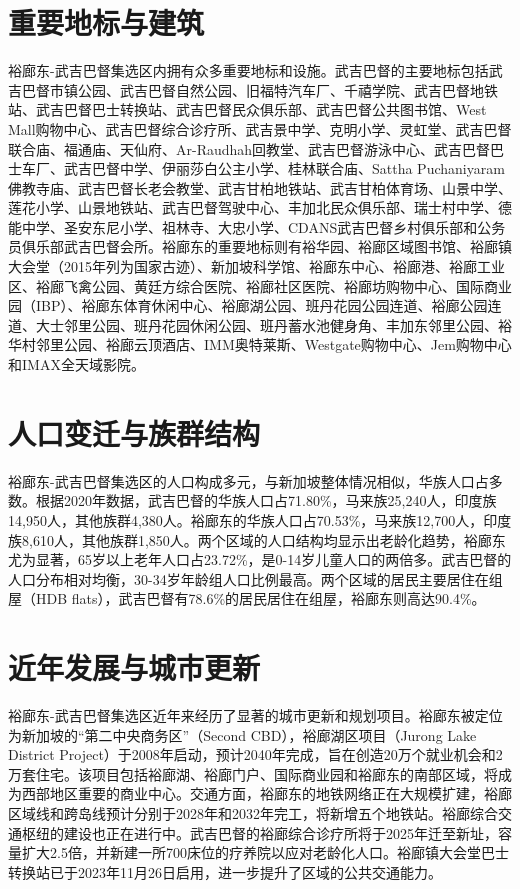 \documentclass[11pt,a4paper,twoside,openany]{book}
\begin{document}
\section{重要地标与建筑}
裕廊东-武吉巴督集选区内拥有众多重要地标和设施。武吉巴督的主要地标包括武吉巴督市镇公园、武吉巴督自然公园、旧福特汽车厂、千禧学院、武吉巴督地铁站、武吉巴督巴士转换站、武吉巴督民众俱乐部、武吉巴督公共图书馆、West Mall购物中心、武吉巴督综合诊疗所、武吉景中学、克明小学、灵虹堂、武吉巴督联合庙、福通庙、天仙府、Ar-Raudhah回教堂、武吉巴督游泳中心、武吉巴督巴士车厂、武吉巴督中学、伊丽莎白公主小学、桂林联合庙、Sattha Puchaniyaram佛教寺庙、武吉巴督长老会教堂、武吉甘柏地铁站、武吉甘柏体育场、山景中学、莲花小学、山景地铁站、武吉巴督驾驶中心、丰加北民众俱乐部、瑞士村中学、德能中学、圣安东尼小学、祖林寺、大忠小学、CDANS武吉巴督乡村俱乐部和公务员俱乐部武吉巴督会所。裕廊东的重要地标则有裕华园、裕廊区域图书馆、裕廊镇大会堂（2015年列为国家古迹）、新加坡科学馆、裕廊东中心、裕廊港、裕廊工业区、裕廊飞禽公园、黄廷方综合医院、裕廊社区医院、裕廊坊购物中心、国际商业园（IBP）、裕廊东体育休闲中心、裕廊湖公园、班丹花园公园连道、裕廊公园连道、大士邻里公园、班丹花园休闲公园、班丹蓄水池健身角、丰加东邻里公园、裕华村邻里公园、裕廊云顶酒店、IMM奥特莱斯、Westgate购物中心、Jem购物中心和IMAX全天域影院。

\section{人口变迁与族群结构}
裕廊东-武吉巴督集选区的人口构成多元，与新加坡整体情况相似，华族人口占多数。根据2020年数据，武吉巴督的华族人口占71.80\%，马来族25,240人，印度族14,950人，其他族群4,380人。裕廊东的华族人口占70.53\%，马来族12,700人，印度族8,610人，其他族群1,850人。两个区域的人口结构均显示出老龄化趋势，裕廊东尤为显著，65岁以上老年人口占23.72\%，是0-14岁儿童人口的两倍多。武吉巴督的人口分布相对均衡，30-34岁年龄组人口比例最高。两个区域的居民主要居住在组屋（HDB flats），武吉巴督有78.6\%的居民居住在组屋，裕廊东则高达90.4\%。

\section{近年发展与城市更新}
裕廊东-武吉巴督集选区近年来经历了显著的城市更新和规划项目。裕廊东被定位为新加坡的“第二中央商务区”（Second CBD），裕廊湖区项目（Jurong Lake District Project）于2008年启动，预计2040年完成，旨在创造20万个就业机会和2万套住宅。该项目包括裕廊湖、裕廊门户、国际商业园和裕廊东的南部区域，将成为西部地区重要的商业中心。交通方面，裕廊东的地铁网络正在大规模扩建，裕廊区域线和跨岛线预计分别于2028年和2032年完工，将新增五个地铁站。裕廊综合交通枢纽的建设也正在进行中。武吉巴督的裕廊综合诊疗所将于2025年迁至新址，容量扩大2.5倍，并新建一所700床位的疗养院以应对老龄化人口。裕廊镇大会堂巴士转换站已于2023年11月26日启用，进一步提升了区域的公共交通能力。
\end{document}

